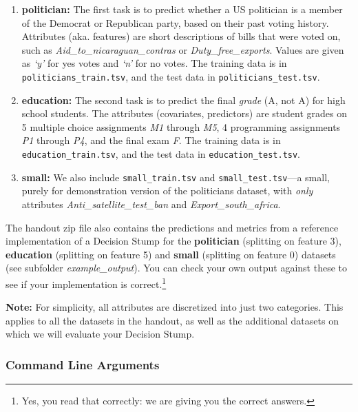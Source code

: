\documentclass[11pt,addpoints,answers]{exam}
\numberwithin{equation}{section} %
\numberwithin{figure}{section} %
\numberwithin{table}{section} %
\begin{document}
\begin{enumerate}
\item \textbf{politician:}
    The first task is to predict whether a US politician is a member of the Democrat or Republican party, based on their past voting history. Attributes (aka. features) are short descriptions of bills that were voted on, such as \emph{Aid\_to\_nicaraguan\_contras} or \emph{Duty\_free\_exports}. Values are given as \emph{`y'} for yes votes and \emph{`n'} for no votes. The training data is in \lstinline{politicians_train.tsv}, and the test data in \lstinline{politicians_test.tsv}.
\item \textbf{education:}
    The second task is to predict the final \emph{grade} (A, not A) for high school students. The attributes (covariates, predictors) are student grades on 5 multiple choice assignments \emph{M1} through \emph{M5}, 4 programming assignments \emph{P1} through \emph{P4}, and the final exam \emph{F}. The training data is in \newline \lstinline{education_train.tsv}, and the test data in \lstinline{education_test.tsv}.
\item \textbf{small:}
    We also include \lstinline{small_train.tsv} and \lstinline{small_test.tsv}---a small, purely for demonstration version of the politicians dataset, with \emph{only} attributes \emph{Anti\_satellite\_test\_ban} and \newline \emph{Export\_south\_africa}.  
\end{enumerate}
    The handout zip file also contains the predictions and metrics from a reference implementation of a Decision Stump for the \textbf{politician} (splitting on feature 3), \textbf{education} (splitting on feature 5) and \textbf{small} (splitting on feature 0) datasets (see subfolder \emph{example\_output}). You can check your own output against these to see if your implementation is correct.\footnote{Yes, you read that correctly: we are giving you the correct answers.}

\begin{notebox} \textbf{Note:}
For simplicity, all attributes are discretized into just two categories. This applies to all the datasets in the handout, as well as the additional datasets on which we will evaluate your Decision Stump.
\end{notebox}

\subsubsection{Command Line Arguments}
\end{document}
